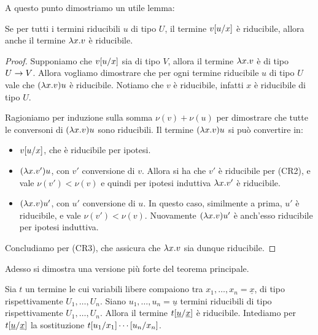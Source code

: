 \documentclass[]{marticle}
\begin{document}
A questo punto dimostriamo un utile lemma:
\begin{block}[Lemma]
    Se per tutti i termini riducibili $u$ di tipo $U$, il termine $v[u/x]$
    \`e riducibile, allora anche il termine $\lambda x.v$ \`e riducibile.
\end{block}

\begin{proof}
    Supponiamo che $v[u/x]$ sia di tipo $V$, allora il termine $\lambda x.v$ \`e
    di tipo $U\rightarrow V$. Allora vogliamo dimostrare che per ogni termine
    riducibile $u$ di tipo $U$ vale che $(\lambda x.v)u$ \`e riducibile. Notiamo che
    $v$ \`e riducibile, infatti $x$ \`e riducibile di tipo $U$.

    Ragioniamo per induzione sulla somma $\nu(v)+\nu(u)$ per dimostrare che
    tutte le conversoni di $(\lambda x.v)u$ sono riducibili. Il termine $(\lambda x.v)u$
    si pu\`o convertire in:
    \begin{itemize}
        \item $v[u/x]$, che \`e riducibile per ipotesi.
        \item $(\lambda x. v')u$, con $v'$ conversione di $v$. Allora si ha che $v'$
            \`e riducibile per (CR2), e vale $\nu(v')<\nu(v)$ e quindi per
            ipotesi induttiva $\lambda x. v'$ \`e riducibile.
        \item $(\lambda x. v)u'$, con $u'$ conversione di $u$. In questo caso,
            similmente a prima, $u'$ \`e riducibile, e vale $\nu(v')<\nu(v)$.
            Nuovamente $(\lambda x. v)u'$ \`e anch'esso riducibile per ipotesi
            induttiva.
    \end{itemize}
    Concludiamo per (CR3), che assicura che $\lambda x.v$ sia dunque riducibile.
\end{proof}

Adesso si dimostra una versione pi\`u forte del teorema principale.

\begin{block}[Proposizione]
    Sia $t$ un termine le cui variabili libere compaiono tra $x_1, \dots, x_n =
    \underline{x}$, di tipo rispettivamente $U_1, \dots, U_n$. Siano $u_1,
    \dots, u_n = \underline{u}$ termini riducibili di tipo rispettivamente $U_1,
    \dots, U_n$. Allora il termine $t[\underline{u}/\underline{x}]$ \`e
    riducibile. Intediamo per $t[\underline{u}/\underline{x}]$ la
    sostituzione $t[u_1/x_1]\cdots[u_n/x_n]$.
\end{block}
\end{document}
